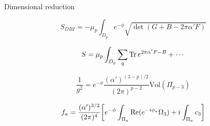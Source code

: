 Dimensional reduction

\begin{equation}
  S_{DBI} = -\mu_p \int_{D_p} e^{-\phi}\sqrt{\det (G+B-2\pi \alpha' F)}
\end{equation}

\begin{equation}
  S = \mu_p \int_{D_p} \sum_q \Tr e^{2\pi \alpha' F-B}+\cdots
\end{equation}

\begin{equation}
  \frac{1}{g^2}=e^{-\phi}\frac{(\alpha')^{(3-p)/2}}{(2\pi)^{p-2}}\mathrm{Vol}(\Pi_{p-3})
\end{equation}

\begin{equation}
  f_a = \frac{(\alpha')^{3/2}}{(2\pi)^4}\qty[e^{-\phi}\int_{\Pi_a}\Re(e^{-i\phi_a}\Omega_3)+ i\int_{\Pi_a}c_3]
\end{equation}
